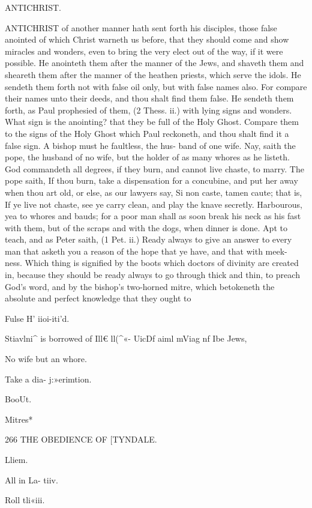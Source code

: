 \documentclass{custom}
\begin{document}
{ANTICHRIST.

ANTICHRIST of another manner hath sent forth his 
disciples, those false anointed of which Christ warneth 
us before, that they should come and show miracles and 
wonders, even to bring the very elect out of the way, if it 
were possible. He anointeth them after the manner of 
the Jews, and shaveth them and sheareth them after the 
manner of the heathen priests, which serve the idols. He 
sendeth them forth not with false oil only, but with false 
names also. For compare their names unto their deeds, 
and thou shalt find them false. He sendeth them forth, 
as Paul prophesied of them, (2 Thess. ii.) with lying signs 
and wonders. What sign is the anointing? that they 
be full of the Holy Ghost. Compare them to the signs 
of the Holy Ghost which Paul reckoneth, and thou shalt 
find it a false sign. A bishop must he faultless, the hus- 
band of one wife. Nay, saith the pope, the husband of 
no wife, but the holder of as many whores as he listeth. 
God commandeth all degrees, if they burn, and cannot live 
chaste, to marry. The pope saith, If thou burn, take a 
dispensation for a concubine, and put her away when thou 
art old, or else, as our lawyers say, Si non caste, tamen 
caute; that is, If ye live not chaste, see ye carry clean, and 
play the knave secretly. Harbourous, yea to whores and 
bauds; for a poor man shall as soon break his neck as his 
fast with them, but of the scraps and with the dogs, when 
dinner is done. Apt to teach, and as Peter saith, (1 Pet. ii.) 
Ready always to give an answer to every man that asketh 
you a reason of the hope that ye have, and that with meek- 
ness. Which thing is signified by the boots which doctors 
of divinity are created in, because they should be ready 
always to go through thick and thin, to preach God's word, 
and by the bishop's two-horned mitre, which betokeneth 
the absolute and perfect knowledge that they ought to 

Fulse H' 
iioi-iti'd. 

Stiavlni^ is 
borrowed 
of Ill€ ll(^«- 
UicDf aiml 
mViag nf 
Ibe Jews, 

No wife 
but an 
whore. 

Take a dia- 
j:»erimtion. 

BooUt. 

Mitres* 


266
THE OBEDIENCE OF
[TYNDALE.

Lliem. 

All in La- 
tiiv. 

Roll tli«iii. 

}
\end{document}
